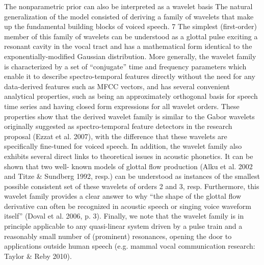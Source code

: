 \begin{chaptersections}
The nonparametric prior can also be interpreted as a wavelet basis
The natural generalization of the model
consisted of deriving a family of wavelets that make up the fundamental building blocks of
voiced speech. 7 The simplest (first-order) member of this family of wavelets can be
understood as a glottal pulse exciting a resonant cavity in the vocal tract and has a
mathematical form identical to the exponentially-modified Gaussian distribution. More
generally, the wavelet family is characterized by a set of “conjugate” time and frequency
parameters which enable it to describe spectro-temporal features directly without the need for
any data-derived features such as MFCC vectors, and has several convenient analytical
properties, such as being an approximately orthogonal basis for speech time series and having
closed form expressions for all wavelet orders. These properties show that the derived wavelet
family is similar to the Gabor wavelets originally suggested as spectro-temporal feature
detectors in the research proposal (Ezzat et al. 2007), with the difference that these wavelets
are specifically fine-tuned for voiced speech. In addition, the wavelet family also exhibits
several direct links to theoretical issues in acoustic phonetics. It can be shown that two well-
known models of glottal flow production (Alku et al. 2002 and Titze \& Sundberg 1992, resp.)
can be understood as instances of the smallest possible consistent set of these wavelets of
orders 2 and 3, resp. Furthermore, this wavelet family provides a clear answer to why “the
shape of the glottal flow derivative can often be recognized in acoustic speech or singing
voice waveform itself” (Doval et al. 2006, p. 3). Finally, we note that the wavelet family is in
principle applicable to any quasi-linear system driven by a pulse train and a reasonably small
number of (prominent) resonances, opening the door to applications outside human speech
(e.g. mammal vocal communication research: Taylor \& Reby 2010).

\end{chaptersections}

